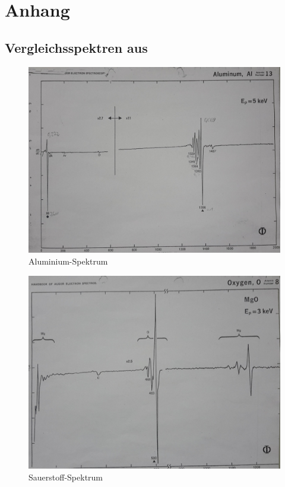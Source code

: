 \documentclass[12pt, oneside, a4paper]{article}
\begin{document}
		


	\newpage

	

	\newpage

	\section*{Anhang} %
	\label{sec:anhang}
	
		\subsection*{Vergleichsspektren aus \cite{handbook}} %
		\label{sub:vergleichsspektren_aus_cite_handbook}
		
			\begin{figure}[H]
				\center
				\includegraphics[scale=0.15]{al-spektrum.jpg}
				\caption{Aluminium-Spektrum}
			\end{figure}

			\begin{figure}[H]
				\center
				\includegraphics[scale=0.15]{o-spektrum.jpg}
				\caption{Sauerstoff-Spektrum}
			\end{figure}
\end{document}
